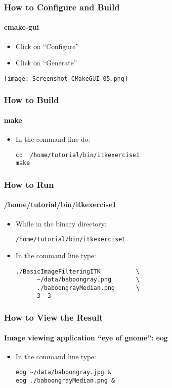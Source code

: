 \begin{frame}[fragile]
\frametitle{How to Configure and Build}
\framesubtitle{cmake-gui}
\begin{itemize}
\item Click on ``Configure''
\item Click on ``Generate''
\end{itemize}
\begin{center}
  \texttt{[image: Screenshot-CMakeGUI-05.png]}
\end{center}
\end{frame}

\begin{frame}[fragile]
\frametitle{How to Build}
\framesubtitle{make}
\begin{itemize}
\item In the command line do:
\begin{verbatim}
cd  /home/tutorial/bin/itkexercise1
make
\end{verbatim}
\end{itemize}
\end{frame}

\begin{frame}[fragile]
\frametitle{How to Run}
\framesubtitle{/home/tutorial/bin/itkexercise1}
\begin{itemize}
\item While in the binary directory:
\begin{verbatim}
/home/tutorial/bin/itkexercise1
\end{verbatim}
\item In the command line type:
\begin{verbatim}
./BasicImageFilteringITK          \
      ~/data/baboongray.png       \
      ./baboongrayMedian.png      \
      3  3
\end{verbatim}
\end{itemize}
\end{frame}

\begin{frame}[fragile]
\frametitle{How to View the Result}
\framesubtitle{Image viewing application ``eye of gnome'': eog}
\begin{itemize}
\item In the command line type:
\begin{verbatim}
eog ~/data/baboongray.jpg &
eog ./baboongrayMedian.png &
\end{verbatim}
\end{itemize}
\end{frame}

